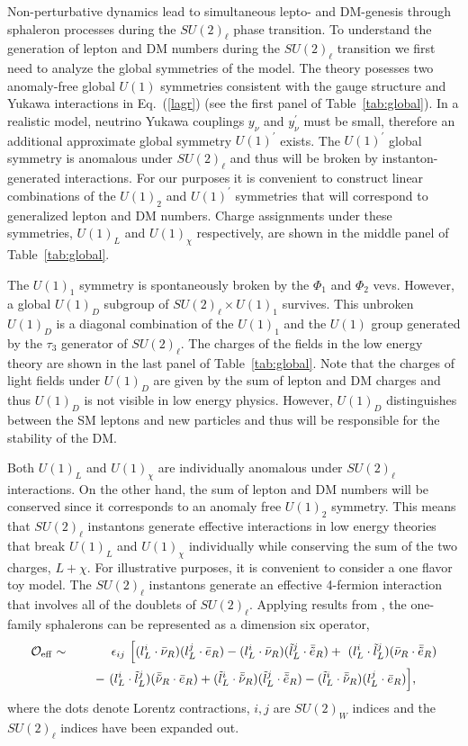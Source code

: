 \documentclass[prd,showpcs,amsmath,amssymb,nofootinbib,preprintnumbers,balancelastpage,longbibliography,superscriptaddress,notitlepage]{revtex4}
\def\bea{\begin{eqnarray}}
\def\eea{\end{eqnarray}}
\def\bea{\begin{eqnarray}}
\def\eea{\end{eqnarray}}
\begin{document}
Non-perturbative dynamics lead to simultaneous lepto- and DM-genesis through sphaleron processes during the $SU(2)_\ell$ phase transition. To understand the generation of lepton and DM numbers during the $SU(2)_\ell$ transition we first need to analyze the global symmetries of the model. The theory posesses two anomaly-free global $U(1)$ symmetries consistent with the gauge structure and Yukawa interactions in Eq.~(\ref{lagr}) (see the first panel of Table~\ref{tab:global}).  In a realistic model, neutrino Yukawa couplings $y_\nu$ and $y_\nu^\prime$ must be small, therefore an additional approximate global symmetry $U(1)^\prime$ exists. The $U(1)^\prime$ global symmetry is anomalous under $SU(2)_\ell$ and thus will be broken by instanton-generated interactions. For our purposes it is convenient to construct linear combinations of the $U(1)_2$ and $U(1)^\prime$ symmetries that will correspond to generalized lepton and DM numbers. Charge assignments under these symmetries, $U(1)_L$ and $U(1)_\chi$ respectively, are shown in the middle panel of Table~\ref{tab:global}. 

The $U(1)_1$ symmetry is spontaneously broken by the $\Phi_1$ and $\Phi_2$ vevs.  However, a global $U(1)_D$ subgroup of $SU(2)_\ell\times U(1)_1$ survives. This unbroken $U(1)_D$ is a diagonal combination of the $U(1)_1$ and the $U(1)$ group generated by the $\tau_3$ generator of $SU(2)_\ell$. The charges of the fields in the low energy theory are shown in the last panel of Table~\ref{tab:global}. Note that the charges of light fields under $U(1)_D$ are given by the sum of lepton and DM charges and thus $U(1)_D$ is not visible in low energy physics. However, $U(1)_D$ distinguishes between the SM leptons and new particles and thus will be responsible for the stability of the DM.

Both $U(1)_L$ and $U(1)_\chi$ are individually anomalous under $SU(2)_\ell$ interactions. On the other hand, the sum of lepton and DM numbers will be conserved since it corresponds to an anomaly free $U(1)_2$ symmetry. This means that $SU(2)_\ell$ instantons generate effective interactions in low energy theories that break $U(1)_L$ and $U(1)_\chi$ individually while conserving the sum of the two charges, $L+\chi$. For illustrative purposes, it is convenient to consider a one flavor toy model. The $SU(2)_\ell$ instantons generate an effective 4-fermion interaction that involves all of the doublets of $SU(2)_{\ell}$. Applying results from \cite{Morrissey:2005uza}, the one-family sphalerons can be represented as a dimension six operator,
\bea
\mathcal{O}_{\rm eff} &\sim& \epsilon_{ij} \ \Big[(l_L^i \cdot \bar{{\nu}}_R)(l_L^j \cdot \bar{{e}}_R) - (l_L^i \cdot \bar{{\nu}}_R)(\tilde{l}_L^j \cdot \bar{\tilde{e}}_R) + \ (l_L^i \cdot \tilde{l}_L^j)(\bar{\nu}_R \cdot \bar{\tilde{e}}_R)\nonumber\\
&&\ \ \ \  - \  (l_L^i \cdot \tilde{l}_L^j)(\bar{\tilde{\nu}}_R \cdot \bar{{e}}_R) +   (\tilde{l}_L^i \cdot \bar{\tilde{\nu}}_R)(\tilde{l}_L^j \cdot \bar{\tilde{e}}_R) - (\tilde{l}_L^i \cdot \bar{\tilde{\nu}}_R)({l}_L^j \cdot \bar{{e}}_R)\Big], \ \ \ \ \ 
\label{inst}
\eea
where the dots denote Lorentz contractions, $i, j$ are $SU(2)_W$ indices and the $SU(2)_\ell$ indices have been expanded out. 
\end{document}
